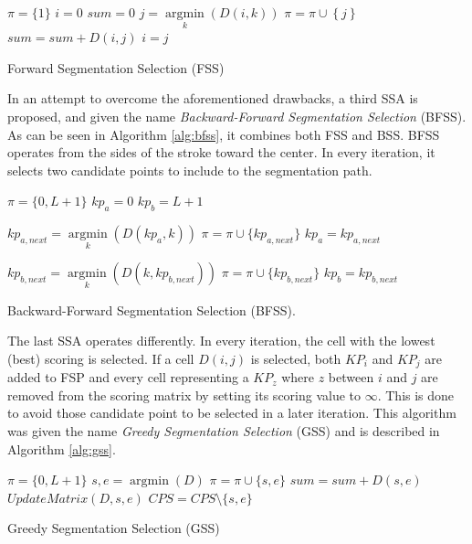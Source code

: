 \documentclass[10pt, conference, compsocconf]{IEEEtran}
\begin{document}
\begin{algorithm}
$\pi = \{1\} $\;
$i=0$\;
$sum=0$\;
{
	$j = \mathop {\arg \min }\limits_k \left( {D\left( {i,k} \right)} \right)$\;
	$\pi = \pi \cup \left\{ j \right\}$\;
	$sum = sum + D\left( {i,j} \right)$\;
	$i=j$\;
}
\caption{Forward Segmentation Selection (FSS)}
\label{alg:fss}
\end{algorithm}

In an attempt to overcome the aforementioned drawbacks, a third SSA is proposed, and given the name \emph{Backward-Forward Segmentation Selection} (BFSS). As can be seen in Algorithm \ref{alg:bfss}, it combines both FSS and BSS. BFSS operates from the sides of the stroke toward the center. In every iteration, it selects two candidate points to include to the segmentation path. \\

\begin{algorithm}
$\pi = \{0,L+1\}$\;
$kp_{a}=0$\;
$kp_{b}=L+1$\;
{
	$kp_{a,next} = \mathop {\arg \min}\limits_k (D(kp_a,k))$\;
	$\pi = \pi \cup \{kp_{a,next}\}$\;
	$kp_{a}=kp_{a,next}$\;
	
	$kp_{b,next} = \mathop {\arg \min}\limits_k (D(k,kp_{b,next}))$\;
	$\pi = \pi \cup \{kp_{b,next}\}$\;	
	$kp_{b}=kp_{b,next}$\;
}

\caption{Backward-Forward Segmentation Selection (BFSS).}
\label{alg:bfss}
\end{algorithm}
  
The last SSA operates differently. In every iteration, the cell with the lowest (best) scoring is selected. If a cell $D(i,j)$ is selected, both $KP_{i}$ and $KP_{j}$ are added to FSP and every cell representing a $KP_{z}$ where $z$ between $i$ and $j$ are removed from the scoring matrix by setting its scoring value to $\infty$. This is done to avoid those candidate point to be selected in a later iteration. This algorithm was given the name \emph{Greedy Segmentation Selection} (GSS) and is described in Algorithm \ref{alg:gss}.\\

\begin{algorithm}
$\pi = \{0,L+1\}$\;
{
	${s,e} = \mathop {\arg \min}(D)$\;
	$\pi = \pi \cup \{s,e\}$\;
	$sum = sum + D(s,e)$\;
	$UpdateMatrix(D,s,e)$\;
	$CPS = CPS\setminus\{s,e\}$\;
}

\caption{Greedy Segmentation Selection (GSS)}
\label{alg:gss}
\end{algorithm}
\end{document}
